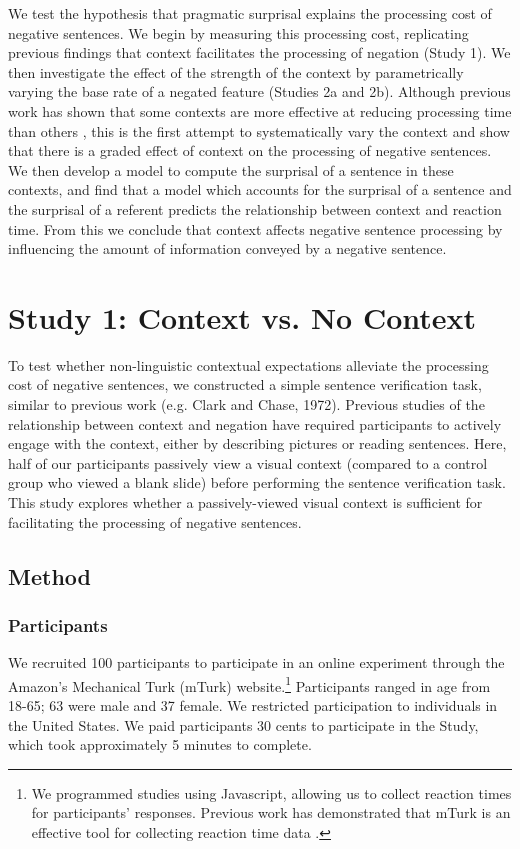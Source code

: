 \documentclass[10pt,letterpaper]{article}
\begin{document}
We test the hypothesis that pragmatic surprisal explains the processing cost of negative sentences.  We begin by measuring this processing cost, replicating previous findings that context facilitates the processing of negation (Study 1).  We then investigate the effect of the strength of the context by parametrically varying the base rate of a negated feature (Studies 2a and 2b).  Although previous work has shown that some contexts are more effective at reducing processing time than others \cite{ludtke2006, dale2011}, this is the first attempt to systematically vary the context and show that there is a graded effect of context on the processing of negative sentences.  We then develop a model to compute the surprisal of a sentence in these contexts, and find that a model which accounts for the surprisal of a sentence and the surprisal of a referent predicts the relationship between context and reaction time.  From this we conclude that context affects negative sentence processing by influencing the amount of information conveyed by a negative sentence.

\section{Study 1: Context vs. No Context}
To test whether non-linguistic contextual expectations alleviate the processing cost of negative sentences, we constructed a simple sentence verification task, similar to previous work (e.g. Clark and Chase, 1972).  Previous studies of the relationship between context and negation have required participants to actively engage with the context, either by describing pictures \cite{wason1965} or reading sentences\cite{glenberg1999}.  Here, half of our participants passively view a visual context (compared to a control group who viewed a blank slide) before performing the sentence verification task.   This study explores whether a passively-viewed visual context is sufficient for facilitating the processing of negative sentences.  

\subsection{Method}

\subsubsection{Participants}

We recruited 100 participants to participate in an online experiment through the Amazon's Mechanical Turk (mTurk) website.\footnote{We programmed studies using Javascript, allowing us to collect reaction times for participants' responses.  Previous work has demonstrated that mTurk is an effective tool for collecting reaction time data \cite{crump2013}.}  Participants ranged in age from 18-65; 63 were male and 37 female.  We restricted participation to individuals in the United States. We paid participants 30 cents to participate in the Study, which took approximately 5 minutes to complete.  
\end{document}
